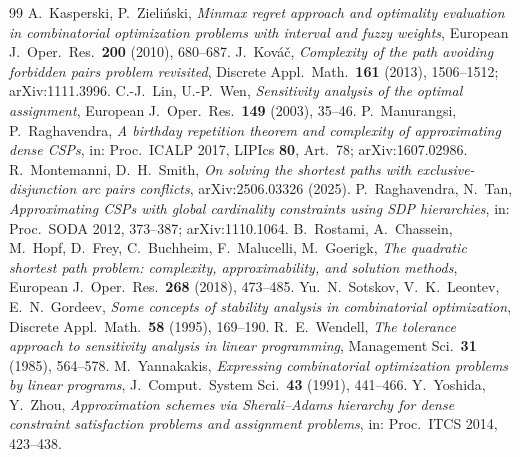\documentclass[11pt]{amsart}
\theoremstyle{plain}
\theoremstyle{definition}
\theoremstyle{remark}
\begin{document}
\begin{thebibliography}{99}
 A.~Kasperski, P.~Zieli\'nski, \emph{Minmax regret approach and optimality evaluation in combinatorial
  optimization problems with interval and fuzzy weights}, European J.\ Oper.\ Res.\ \textbf{200} (2010), 680--687.
 J.~Kov\'a\v{c}, \emph{Complexity of the path avoiding forbidden pairs problem revisited},
  Discrete Appl.\ Math.\ \textbf{161} (2013), 1506--1512; arXiv:1111.3996.
 C.-J.~Lin, U.-P.~Wen, \emph{Sensitivity analysis of the optimal assignment}, European J.\ Oper.\
  Res.\ \textbf{149} (2003), 35--46.
 P.~Manurangsi, P.~Raghavendra, \emph{A birthday repetition theorem and complexity of approximating
  dense CSPs}, in: Proc.\ ICALP 2017, LIPIcs \textbf{80}, Art.~78; arXiv:1607.02986.
\bibitem{MS} R.~Montemanni, D.~H.~Smith, \emph{On solving the shortest paths with exclusive-disjunction arc pairs
  conflicts}, arXiv:2506.03326 (2025).
 P.~Raghavendra, N.~Tan, \emph{Approximating CSPs with global cardinality constraints using SDP
  hierarchies}, in: Proc.\ SODA 2012, 373--387; arXiv:1110.1064.
\bibitem{Rostami} B.~Rostami, A.~Chassein, M.~Hopf, D.~Frey, C.~Buchheim, F.~Malucelli, M.~Goerigk, \emph{The
  quadratic shortest path problem: complexity, approximability, and solution methods}, European J.\ Oper.\ Res.\
  \textbf{268} (2018), 473--485.
\bibitem{SLG} Yu.~N.~Sotskov, V.~K.~Leontev, E.~N.~Gordeev, \emph{Some concepts of stability analysis in
  combinatorial optimization}, Discrete Appl.\ Math.\ \textbf{58} (1995), 169--190.
\bibitem{Wendell} R.~E.~Wendell, \emph{The tolerance approach to sensitivity analysis in linear programming},
  Management Sci.\ \textbf{31} (1985), 564--578.
\bibitem{Yannakakis} M.~Yannakakis, \emph{Expressing combinatorial optimization problems by linear programs},
  J.\ Comput.\ System Sci.\ \textbf{43} (1991), 441--466.
\bibitem{YZ} Y.~Yoshida, Y.~Zhou, \emph{Approximation schemes via Sherali--Adams hierarchy for dense constraint
  satisfaction problems and assignment problems}, in: Proc.\ ITCS 2014, 423--438.
\end{thebibliography}
\end{document}
